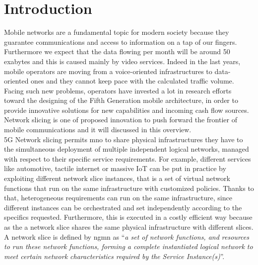 \documentclass[a4paper,12pt]{report} %
\begin{document}
\section{Introduction}
Mobile networks are a fundamental topic for modern society because they guarantee communications and access
to information on a tap of our fingers. Furthermore we expect that the data flowing per month will be around 50 exabytes and this is caused mainly by video services.
Indeed in the last years, mobile operators are moving from a voice-oriented infrastructures to
data-oriented ones and they cannot keep pace with the calculated traffic volume. Facing such new problems, operators have
invested a lot in research efforts toward the designing of the Fifth Generation mobile architecture, in order to provide innovative solutions for new capabilities and incoming cash flow sources. Network slicing is one of proposed innovation to push forward the frontier of mobile communications and it will discussed in this overview.\\
5G Network slicing permits \gls{mno} to share
physical infrastructures they have to the simultaneous deployment
of multiple independent logical networks, managed with respect
to their specific service requirements. 
For example, different services like automotive, tactile internet or massive IoT can be put in practice by exploiting different network slice
instances, that is a set of virtual network functions
that run on the same infrastructure with customized policies. Thanks to that,
heterogeneous requirements can run on the same infrastructure, since
different instances can be orchestrated and set independently
according to the specifics requested. Furthermore, this is executed in a
costly efficient way because as the a network slice shares the same
physical infrastructure with different slices.\\
A network slice is defined by \gls{ngmn} as “\textit{a set of network functions, and
resources to run these network functions, forming a complete instantiated
logical network to meet certain network characteristics required by the Service
Instance(s)}”.\\
\end{document}
